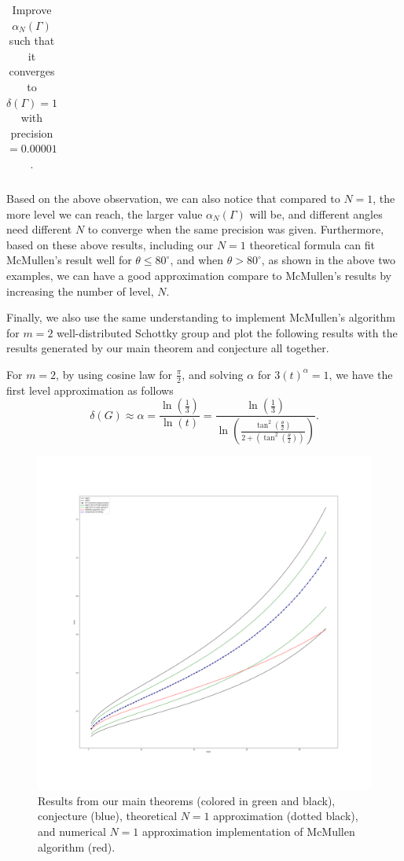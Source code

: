 \documentclass[12pt,oneside]{sfsuthesis}
\theoremstyle{plain} %
\theoremstyle{definition}  %
\theoremstyle{remark}  %
\theoremstyle{plain}
\begin{document}
{\begin{center}
\begin{table}[h]
\begin{tabular}{ c c c }
\end{tabular}
\caption{Improve $\alpha_N(\Gamma)$ such that it converges to $\delta(\Gamma)=1$ with precision$=0.00001$.}
    \label{tab:McMullen}   
\end{table}
\end{center}

Based on the above observation, we can also notice that compared to $N=1$, the more level we can reach, the larger value $\alpha_N(\Gamma)$ will be, and different angles need different $N$ to converge when the same precision was given. Furthermore, based on these above results, including our $N=1$ theoretical formula can fit McMullen's result well for $\theta\leq 80^\circ$, and when $\theta>80^\circ$, as shown in the above two examples, we can have a good approximation compare to McMullen's results by increasing the number of level, $N$. 

Finally, we also use the same understanding to implement McMullen's algorithm for $m=2$ well-distributed Schottky group and plot the following results with the results generated by our main theorem and conjecture all together.

For $m=2$, by using cosine law for $\frac{\pi}{2}$, and solving $\alpha$ for $3(t)^\alpha=1$, we have the first level approximation as follows
$$
\delta(G)\approx \alpha=\frac{\ln\left(\frac{1}{3}\right)}{\ln\left(t \right)}
=\frac{\ln\left(\frac{1}{3}\right)}{\ln\left(\frac{\tan^2\left(\frac{\theta}{2}\right)}{2+\left(\tan^2\left(\frac{\theta}{2}\right)\right)} \right)}.
$$


\begin{figure}[H]
\centering
\includegraphics[width=1\textwidth]{Results from our main theorem, conjecture, and implementation of McMullen algorithm.png}
\caption{Results from our main theorems (colored in green and black), conjecture (blue), theoretical $N=1$ approximation (dotted black), and numerical $N=1$ approximation implementation of McMullen algorithm (red).}
\end{figure}

}
\end{document}

